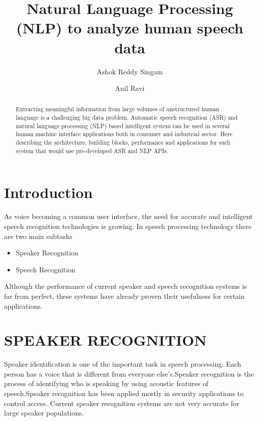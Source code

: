 \documentclass[sigconf]{acmart}
\begin{document}
\title{Natural Language Processing (NLP) to analyze human speech data}

\author{Ashok Reddy Singam}

\author{Anil Ravi}

\begin{abstract}
Extracting meaningful information from large volumes of unstructured human language is a challenging big data problem. Automatic speech recognition (ASR) and natural language processing (NLP) based intelligent system can be  used in several human machine interface applications both in consumer and industrial sector. Here describing the architecture, building blocks, performance and applications for such system that would use pre-developed ASR and NLP APIs.
\end{abstract}



\maketitle


\section{Introduction}
As voice becoming a common user interface, the need for accurate and intelligent speech recognition technologies is growing. In speech processing technology there are two main subtasks 
   \begin{itemize}
     \item Speaker Recognition
     \item Speech Recognition
   \end{itemize}
Although the performance of current speaker and speech  recognition systems is far from perfect, these  systems  have already proven their usefulness for certain applications. 
\section{SPEAKER RECOGNITION}
Speaker identification is one of the important task in speech processing. Each person has a voice that is different from everyone else’s.Speaker recognition is the process of identifying who is speaking by using acoustic features of speech.Speaker recognition has been applied mostly in security applications to control access. Current speaker recognition systems are not very accurate for large speaker populations. 
\end{document}
